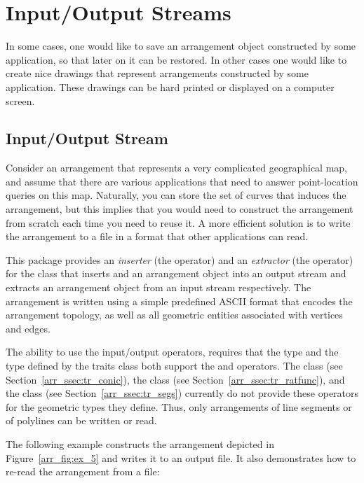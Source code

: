 \section{Input/Output Streams\label{arr_sec:io}}

In some cases, one would like to save an arrangement object
constructed by some application, so that later on it can be
restored. In other cases one would like to create nice drawings that
represent arrangements constructed by some application. These
drawings can be hard printed or displayed on a computer screen.

\subsection{Input/Output Stream\label{arr_ssec:io_stream}}
Consider an arrangement that represents a very complicated geographical 
map, and assume that there are various applications that need to answer 
point-location queries on this map. Naturally, you can store the set of 
curves that induces the arrangement, but this implies that you would need 
to construct the arrangement from scratch each time you need to reuse it.
A more efficient solution is to write the arrangement to a file in a format 
that other applications can read.

This package provides an {\em inserter} (the \ccc{<<} operator) and an 
{\em extractor} (the \ccc{>>} operator) for the 
 class that inserts and an arrangement
object into an output stream and extracts an arrangement object from an
input stream respectively. The arrangement is written using a simple
predefined ASCII format that encodes the arrangement topology, as well
as all geometric entities associated with vertices and edges.

The ability to use the input/output operators, requires that the 
 type and the  type defined by the 
traits class both support the \ccc{<<} and \ccc{>>} operators. The 
 class (see Section~\ref{arr_ssec:tr_conic}), the 
 class (see Section~\ref{arr_ssec:tr_ratfunc}),
and the  class (see Section~\ref{arr_ssec:tr_segs})
currently do not provide these operators for the geometric types they define. 
Thus, only arrangements of line segments or of polylines can be written or 
read.

The following example constructs the arrangement depicted in 
Figure~\ref{arr_fig:ex_5} and writes it to an output file. It also
demonstrates how to re-read the arrangement from a file:

